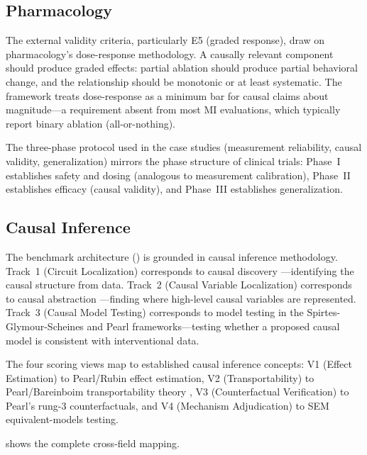 \documentclass[10pt]{article}
\begin{document}
\subsection{Pharmacology}
\label{sec:pharma}

The external validity criteria, particularly E5 (graded response), draw on pharmacology's dose-response methodology. A causally relevant component should produce graded effects: partial ablation should produce partial behavioral change, and the relationship should be monotonic or at least systematic. The framework treats dose-response as a minimum bar for causal claims about magnitude---a requirement absent from most MI evaluations, which typically report binary ablation (all-or-nothing).

The three-phase protocol used in the case studies (measurement reliability, causal validity, generalization) mirrors the phase structure of clinical trials: Phase~I establishes safety and dosing (analogous to measurement calibration), Phase~II establishes efficacy (causal validity), and Phase~III establishes generalization.

\subsection{Causal Inference}
\label{sec:causal}

The benchmark architecture () is grounded in causal inference methodology. Track~1 (Circuit Localization) corresponds to causal discovery \citep{spirtes2000causation}---identifying the causal structure from data. Track~2 (Causal Variable Localization) corresponds to causal abstraction \citep{geiger2023causal}---finding where high-level causal variables are represented. Track~3 (Causal Model Testing) corresponds to model testing in the Spirtes-Glymour-Scheines and Pearl frameworks---testing whether a proposed causal model is consistent with interventional data.

The four scoring views map to established causal inference concepts: V1 (Effect Estimation) to Pearl/Rubin effect estimation, V2 (Transportability) to Pearl/Bareinboim transportability theory \citep{pearl2011transportability}, V3 (Counterfactual Verification) to Pearl's rung-3 counterfactuals, and V4 (Mechanism Adjudication) to SEM equivalent-models testing.

 shows the complete cross-field mapping.
\end{document}
